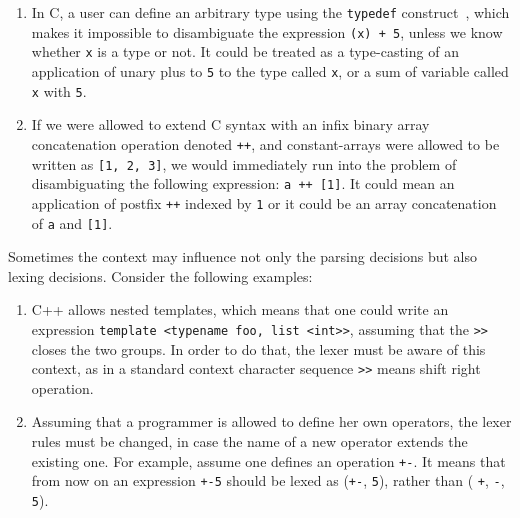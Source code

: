 \begin{enumerate}
    \item %
          In C, a user can define an arbitrary type using the
          \verb|typedef| construct~\cite{c99}, which makes it impossible 
          to disambiguate the expression \verb|(x) + 5|, unless
          we know whether \verb|x| is a type or not. It could
          be treated as a type-casting of an application of unary
          plus to \verb|5| to the type called \verb|x|,
          or a sum of variable called \verb|x| with \verb|5|.
    \item If we were allowed to extend C syntax with an infix 
          binary array concatenation operation denoted \verb|++|, and
          constant-arrays were allowed to be written as 
          \verb|[1, 2, 3]|,
          we  would immediately run into the problem of disambiguating
          the following expression: \verb|a ++ [1]|.  It could mean
          an application of postfix \verb|++| indexed by \verb|1|
          or it could be an array concatenation of \verb|a| and 
          \verb|[1]|.
\end{enumerate}

\noindent
Sometimes the context may influence not only the parsing decisions but 
also lexing decisions.  Consider the following examples:
\begin{enumerate}
    \item C++ allows nested templates, which means that one could
          write an expression \verb|template <typename foo, list <int>>|, 
          assuming that the \verb|>>| closes the two groups.  In
          order to do that, the lexer must be aware of this context,
          as in a standard context character sequence \verb|>>| means
          shift right operation.
    \item Assuming that a programmer is allowed to define her own 
          operators, the lexer rules must be changed, in case 
          the name of a new operator extends the existing one.  For
          example, assume one defines an operation \verb|+-|.
          It means that from now on an expression \verb|+-5| should
          be lexed as (\verb|+-|, \verb|5|), rather than (%
          \verb|+|, \verb|-|, \verb|5|).
\end{enumerate}

